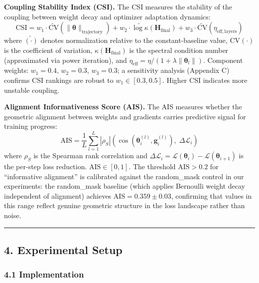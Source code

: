 \documentclass[
]{article}
\begin{document}
\textbf{Coupling Stability Index (CSI).} The CSI measures the stability
of the coupling between weight decay and optimizer adaptation dynamics:
\[
\mathrm{CSI} = w_1 \cdot \widetilde{\mathrm{CV}}(\|\boldsymbol{\theta}\|_{\text{trajectory}}) + w_2 \cdot \widetilde{\log \kappa}(\mathbf{H}_{\text{final}}) + w_3 \cdot \widetilde{\mathrm{CV}}(\eta_{\mathrm{eff}, \text{layers}})
\] where \(\widetilde{(\cdot)}\) denotes normalization relative to the
constant-baseline value, \(\mathrm{CV}(\cdot)\) is the coefficient of
variation, \(\kappa(\mathbf{H}_{\text{final}})\) is the spectral
condition number (approximated via power iteration), and
\(\eta_{\mathrm{eff}} = \eta / (1 + \lambda \|\boldsymbol{\theta}_l\|)\).
Component weights: \(w_1 = 0.4\), \(w_2 = 0.3\), \(w_3 = 0.3\); a
sensitivity analysis (Appendix C) confirms CSI rankings are robust to
\(w_1 \in [0.3, 0.5]\). Higher CSI indicates more unstable coupling.

\textbf{Alignment Informativeness Score (AIS).} The AIS measures whether
the geometric alignment between weights and gradients carries predictive
signal for training progress: \[
\mathrm{AIS} = \frac{1}{L}\sum_{l=1}^{L} |\rho_S|\!\left(\cos(\boldsymbol{\theta}^{(l)}_i, \mathbf{g}^{(l)}_i),\; \Delta\mathcal{L}_i\right)
\] where \(\rho_S\) is the Spearman rank correlation and
\(\Delta\mathcal{L}_i = \mathcal{L}(\boldsymbol{\theta}_{i}) - \mathcal{L}(\boldsymbol{\theta}_{i+1})\)
is the per-step loss reduction. \(\mathrm{AIS} \in [0, 1]\). The
threshold \(\mathrm{AIS} > 0.2\) for ``informative alignment'' is
calibrated against the random\_mask control in our experiments: the
random\_mask baseline (which applies Bernoulli weight decay independent
of alignment) achieves \(\mathrm{AIS} = 0.359 \pm 0.03\), confirming
that values in this range reflect genuine geometric structure in the
loss landscape rather than noise.

\begin{center}\rule{0.5\linewidth}{0.5pt}\end{center}

\hypertarget{experimental-setup}{%
\subsection{4. Experimental Setup}\label{experimental-setup}}

\hypertarget{implementation}{%
\subsubsection{4.1 Implementation}\label{implementation}}
\end{document}
